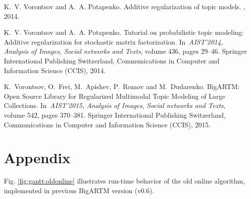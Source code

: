 \documentclass[russian,english]{llncs}
\newcommand{\kw}[1]{\textsf{#1}}
\begin{document}
\begin{thebibliography}{10}
K.~V. Vorontsov and A.~A. Potapenko.
\newblock Additive regularization of topic models.
, 2014.

K.~V. Vorontsov and A.~A. Potapenko.
\newblock Tutorial on probabilistic topic modeling: Additive regularization for stochastic matrix factorization.
\newblock In~{\em AIST'2014, Analysis of Images, Social networks and Texts},
volume 436, pages 29--46. Springer International Publishing Switzerland,
Communications in Computer and Information Science (CCIS), 2014.

K.~Vorontsov, O.~Frei, M.~Apishev, P.~Romov and M.~Dudarenko.
\newblock BigARTM: Open Source Library for Regularized Multimodal Topic Modeling of Large Collections.
\newblock In~{\em AIST'2015, Analysis of Images, Social networks and Texts},
volume 542, pages 370--381. Springer International Publishing Switzerland,
Communications in Computer and Information Science (CCIS), 2015.




\end{thebibliography}

\newpage
\section*{Appendix}
\label{sec:Appendix}

Fig. \ref{fig:gantt:oldonline} illustrates run-time behavior of the old \kw{online algorithm}, implemented in previous BigARTM version (\kw{v0.6}).
\end{document}
